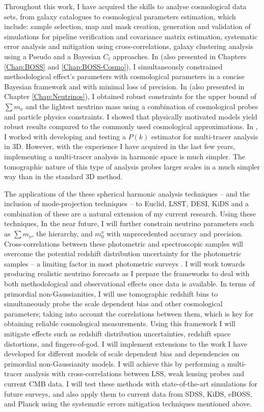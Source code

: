 \qquad Throughout this work, I have acquired the skills to analyse cosmological data sets, from galaxy catalogues to cosmological parameters estimation, which include: sample selection, map and mask creation, generation and validation of simulations for pipeline verification and covariance matrix estimation, systematic error analysis and mitigation using cross-correlations, galaxy clustering analysis using a Pseudo and a Bayesian $C_{\ell}$ approaches. In \cite{2018LoureiroBOSS} (also presented in Chapters \ref{Chap:BOSS} and \ref{Chap:BOSS-Cosmo}), I simultaneously constrained methodological effect's parameters with cosmological parameters in a concise Bayesian framework and with minimal loss of precision. In \cite{2018LoureiroNeutrinos} (also presented in Chapter \ref{Chap:Neutrinos}), I obtained robust constraints for the upper bound of $\sum m_{\nu}$ and the lightest neutrino mass using a combination of cosmological probes and particle physics constraints. I showed that physically motivated models yield robust results compared to the commonly used cosmological approximations. In \cite{2016AbramoSeccoLoureiro}, I worked with developing and testing a $P(k)$ estimator for multi-tracer analysis in 3D. However, with the experience I have acquired in the last few years, implementing a multi-tracer analysis in harmonic space is much simpler. The tomographic nature of this type of analysis probes larger scales in a much simpler way than in the standard 3D method.

\qquad The applications of the these spherical harmonic analysis techniques -- and the inclusion of mode-projection techniques -- to Euclid, LSST, DESI, KiDS and a combination of these are a natural extension of my current research. Using these techniques, In the near future, I will further constrain neutrino parameters such as $\sum m_{\nu}$, the hierarchy, and $m_{0}^{\nu}$ with unprecedented accuracy and precision. Cross-correlations between these photometric and spectroscopic samples will overcome the potential redshift distribution uncertainty for the photometric samples -- a limiting factor in most photometric surveys \cite{2016McLeod}. I will work towards producing realistic neutrino forecasts as I prepare the frameworks to deal with both methodological and observational effects once data is available. In terms of primordial non-Gaussianities, I will use tomographic redshift bins to simultaneously probe the scale dependent bias and other cosmological parameters; taking into account the correlations between them, which is key for obtaining reliable cosmological measurements. Using this framework I will mitigate effects such as redshift distribution uncertainties, redshift space distortions, and fingers-of-god. I will implement extensions to the work I have developed for different models of scale dependent bias and dependencies on primordial non-Gaussianity models. I will achieve this by performing a multi-tracer analysis with cross-correlations between LSS, weak lensing probes and current CMB data. I will test these methods with state-of-the-art simulations for future surveys, and also apply them to current data from SDSS, KiDS, eBOSS, and Planck using the systematic errors mitigation techniques mentioned above. 

